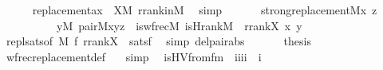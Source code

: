 \begin{isabellebody}
\ \ \ \ \isamarkupfalse%
\ replacement{\isacharunderscore}{\kern0pt}ax\ {}\ {\isacartoucheopen}X{\isasymin}M{\isacartoucheclose}\ rrank{\isacharunderscore}{\kern0pt}in{\isacharunderscore}{\kern0pt}M\ \isamarkupfalse%
\ simp\isanewline
\ \ \isamarkupfalse%
\isanewline
\ \ \isamarkupfalse%
\ {\isachardoublequoteopen}strong{\isacharunderscore}{\kern0pt}replacement{\isacharparenleft}{\kern0pt}{\isacharhash}{\kern0pt}{\isacharhash}{\kern0pt}M{\isacharcomma}{\kern0pt}{\isasymlambda}x\ z{\isachardot}{\kern0pt}\isanewline
\ \ \ \ \ \ \ \ \ \ {\isasymexists}y{\isasymin}M{\isachardot}{\kern0pt}\ pair{\isacharparenleft}{\kern0pt}{\isacharhash}{\kern0pt}{\isacharhash}{\kern0pt}M{\isacharcomma}{\kern0pt}x{\isacharcomma}{\kern0pt}y{\isacharcomma}{\kern0pt}z{\isacharparenright}{\kern0pt}\ {\isacharampersand}{\kern0pt}\ is{\isacharunderscore}{\kern0pt}wfrec{\isacharparenleft}{\kern0pt}{\isacharhash}{\kern0pt}{\isacharhash}{\kern0pt}M{\isacharcomma}{\kern0pt}\ is{\isacharunderscore}{\kern0pt}Hrank{\isacharparenleft}{\kern0pt}{\isacharhash}{\kern0pt}{\isacharhash}{\kern0pt}M{\isacharparenright}{\kern0pt}\ {\isacharcomma}{\kern0pt}\ rrank{\isacharparenleft}{\kern0pt}X{\isacharparenright}{\kern0pt}{\isacharcomma}{\kern0pt}\ x{\isacharcomma}{\kern0pt}\ y{\isacharparenright}{\kern0pt}{\isacharparenright}{\kern0pt}{\isachardoublequoteclose}\isanewline
\ \ \ \ \isamarkupfalse%
\ repl{\isacharunderscore}{\kern0pt}sats{\isacharbrackleft}{\kern0pt}of\ M\ {\isacharquery}{\kern0pt}f\ {\isachardoublequoteopen}{\isacharbrackleft}{\kern0pt}rrank{\isacharparenleft}{\kern0pt}X{\isacharparenright}{\kern0pt}{\isacharbrackright}{\kern0pt}{\isachardoublequoteclose}{\isacharbrackright}{\kern0pt}\ \ satsf\ \isamarkupfalse%
\ {\isacharparenleft}{\kern0pt}simp\ del{\isacharcolon}{\kern0pt}pair{\isacharunderscore}{\kern0pt}abs{\isacharparenright}{\kern0pt}\isanewline
\ \ \isamarkupfalse%
\isanewline
\ \ \isamarkupfalse%
\ {\isacharquery}{\kern0pt}thesis\ \isamarkupfalse%
\ wfrec{\isacharunderscore}{\kern0pt}replacement{\isacharunderscore}{\kern0pt}def\ \ \isamarkupfalse%
\ simp\isanewline
{}\isamarkupfalse%
%
\endisatagproof
{\isafoldproof}%
%
\isadelimproof
\isanewline
%
\endisadelimproof
\isanewline
\isanewline
{}\isamarkupfalse%
\isanewline
\ \ is{\isacharunderscore}{\kern0pt}HVfrom{\isacharunderscore}{\kern0pt}fm\ {\isacharcolon}{\kern0pt}{\isacharcolon}{\kern0pt}\ {\isachardoublequoteopen}{\isacharbrackleft}{\kern0pt}i{\isacharcomma}{\kern0pt}i{\isacharcomma}{\kern0pt}i{\isacharcomma}{\kern0pt}i{\isacharbrackright}{\kern0pt}\ {\isasymRightarrow}\ i{\isachardoublequoteclose}\ \isanewline

\end{isabellebody}

